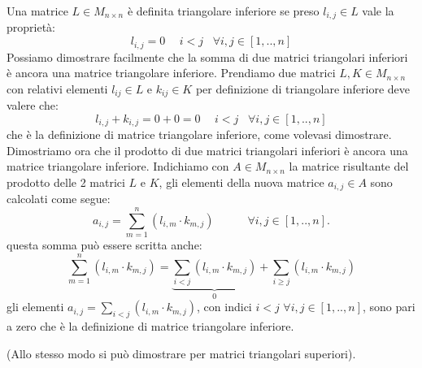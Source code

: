 \begin{flushleft}
Una matrice $L\in M_{n\times n}$ è definita triangolare inferiore se preso $l_{i,j} \in L$ vale la proprietà: 
\[
l_{i,j}=0 \hspace{15pt} i<j \hspace{10pt}\forall i,j \in [1,..,n] 
\]
Possiamo dimostrare facilmente che la somma di due matrici triangolari inferiori è ancora una matrice triangolare inferiore. Prendiamo due matrici $L,K \in M_{n \times n}$ con relativi elementi $l_{ij} \in L$ e $k_{ij} \in K$ per definizione di triangolare inferiore deve valere che:
\[
l_{i,j} + k_{i,j} = 0 + 0 = 0 \hspace{15pt} i<j \hspace{10pt} \forall i,j \in [1,..,n] 
\]
che è la definizione di matrice triangolare inferiore, come volevasi dimostrare. Dimostriamo ora che il prodotto di due matrici triangolari inferiori è ancora una matrice triangolare inferiore. Indichiamo con $A \in M_{n \times n}$ la matrice risultante del prodotto delle 2 matrici $L$ e $K$, gli elementi della nuova matrice $a_{i,j} \in A$ sono calcolati come segue:
\[
a_{i,j} = \sum_{m=1}^n (l_{i,m} \cdot k_{m,j}) \hspace{35pt} \forall i,j \in [1,..,n].
\]
questa somma può essere scritta anche:
\[
\sum_{m=1}^n (l_{i,m} \cdot k_{m,j}) =  \underbrace{ \sum_{i<j} (l_{i,m} \cdot k_{m,j}) }_{0}  + \sum_{i\geq j} (l_{i,m}\cdot k_{m,j})
\]
gli elementi $ a_{i,j} = \sum_{i<j} (l_{i,m} \cdot k_{m,j})$, con indici $i<j$ $\forall i,j \in [1,..,n]$, sono pari a zero che è la definizione di matrice triangolare inferiore.

(Allo stesso modo si può dimostrare per matrici triangolari superiori).
\end{flushleft}